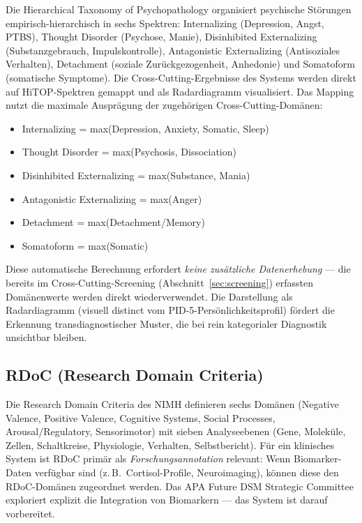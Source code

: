 \documentclass[11pt,a4paper]{article}
\begin{document}
Die Hierarchical Taxonomy of Psychopathology \citep{Kotov2017} organisiert psychische St\"orungen empirisch-hierarchisch in sechs Spektren: Internalizing (Depression, Angst, PTBS), Thought Disorder (Psychose, Manie), Disinhibited Externalizing (Substanzgebrauch, Impulskontrolle), Antagonistic Externalizing (Antisoziales Verhalten), Detachment (soziale Zur\"uckgezogenheit, Anhedonie) und Somatoform (somatische Symptome). Die Cross-Cutting-Ergebnisse des Systems werden direkt auf HiTOP-Spektren gemappt und als Radardiagramm visualisiert. Das Mapping nutzt die maximale Auspr\"agung der zugeh\"origen Cross-Cutting-Dom\"anen:

\begin{itemize}[noitemsep]
\item Internalizing = max(Depression, Anxiety, Somatic, Sleep)
\item Thought Disorder = max(Psychosis, Dissociation)
\item Disinhibited Externalizing = max(Substance, Mania)
\item Antagonistic Externalizing = max(Anger)
\item Detachment = max(Detachment/Memory)
\item Somatoform = max(Somatic)
\end{itemize}

Diese automatische Berechnung erfordert \textit{keine zus\"atzliche Datenerhebung} --- die bereits im Cross-Cutting-Screening (Abschnitt~\ref{sec:screening}) erfassten Dom\"anenwerte werden direkt wiederverwendet. Die Darstellung als Radardiagramm (visuell distinct vom PID-5-Pers\"onlichkeitsprofil) f\"ordert die Erkennung transdiagnostischer Muster, die bei rein kategorialer Diagnostik unsichtbar bleiben.

\subsection{RDoC (Research Domain Criteria)}

Die Research Domain Criteria des NIMH \citep{Insel2010} definieren sechs Dom\"anen (Negative Valence, Positive Valence, Cognitive Systems, Social Processes, Arousal/Regulatory, Sensorimotor) mit sieben Analyseebenen (Gene, Molek\"ule, Zellen, Schaltkreise, Physiologie, Verhalten, Selbstbericht). F\"ur ein klinisches System ist RDoC prim\"ar als \textit{Forschungsannotation} relevant: Wenn Biomarker-Daten verf\"ugbar sind (z.\,B.\ Cortisol-Profile, Neuroimaging), k\"onnen diese den RDoC-Dom\"anen zugeordnet werden. Das APA Future DSM Strategic Committee exploriert explizit die Integration von Biomarkern --- das System ist darauf vorbereitet.
\end{document}
